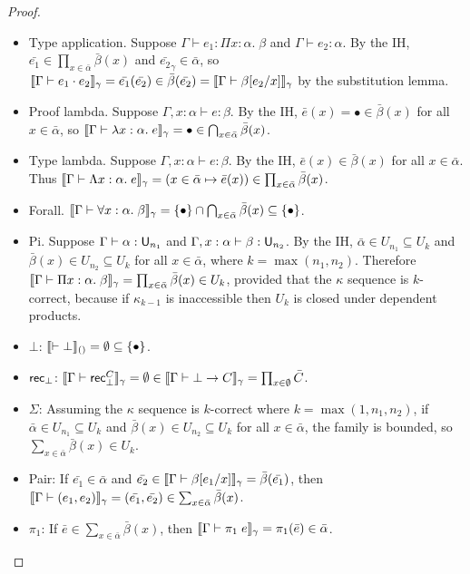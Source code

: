 \begin{proof}
\begin{itemize}
\item Type application. Suppose $\Gamma\vdash e_1:\Pi x:\alpha.\;\beta$ and $\Gamma\vdash e_2:\alpha$. By the IH, $\bar{e_1}\in\prod_{x\in \bar\alpha}\bar\beta(x)$ and $\bar{e_2}_\gamma\in\bar\alpha$, so $\scott{\Gamma\vdash e_1\cdot e_2}_\gamma=\bar{e_1}(\bar{e_2})\in\bar\beta(\bar{e_2})=\scott{\Gamma\vdash\beta[e_2/x]}_\gamma$ by the substitution lemma.
\item Proof lambda. Suppose $\Gamma,x:\alpha\vdash e:\beta$. By the IH, $\bar e(x)=\bullet\in\bar\beta(x)$ for all $x\in\bar\alpha$, so $\scott{\Gamma\vdash\lambda x:\alpha.\;e}_\gamma=\bullet\in\bigcap_{x\in \bar\alpha}\bar\beta(x)$.
\item Type lambda. Suppose $\Gamma,x:\alpha\vdash e:\beta$. By the IH, $\bar e(x)\in\bar\beta(x)$ for all $x\in\bar\alpha$. Thus $\scott{\Gamma\vdash\Lambda x:\alpha.\;e}_\gamma=(x\in\bar\alpha\mapsto\bar e(x))\in\prod_{x\in \bar\alpha}\bar\beta(x)$.
\item Forall. $\scott{\Gamma\vdash\forall x:\alpha.\;\beta}_\gamma=\{\bullet\}\cap\bigcap_{x\in \bar\alpha}\bar\beta(x)\subseteq\{\bullet\}$.
\item Pi. Suppose $\Gamma\vdash\alpha:\U_{n_1}$ and $\Gamma,x:\alpha\vdash\beta:\U_{n_2}$. By the IH, $\bar\alpha\in U_{n_1}\subseteq U_k$ and $\bar\beta(x)\in U_{n_2}\subseteq U_k$ for all $x\in\bar\alpha$, where $k=\max(n_1,n_2)$. Therefore $\scott{\Gamma\vdash\Pi x:\alpha.\;\beta}_\gamma=\prod_{x\in \bar\alpha}\bar\beta(x)\in U_k$, provided that the $\kappa$ sequence is $k$-correct, because if $\kappa_{k-1}$ is inaccessible then $U_k$ is closed under dependent products.
\item $\bot$: $\llbracket \vdash\bot\rrbracket_{()}=\emptyset\subseteq\{\bullet\}$.
\item $\mathsf{rec}_\bot$: $\scott{\Gamma\vdash\rec^C_\bot}_\gamma=\emptyset\in\scott{\Gamma\vdash\bot\to C}_\gamma=\prod_{x\in\emptyset}\bar C$.
\item $\Sigma$: Assuming the $\kappa$ sequence is $k$-correct where $k=\max(1,n_1,n_2)$, if $\bar\alpha\in U_{n_1}\subseteq U_k$ and $\bar\beta(x)\in U_{n_2}\subseteq U_k$ for all $x\in \bar\alpha$, the family is bounded, so $\sum_{x\in\bar\alpha}\bar\beta(x)\in U_k$.
\item Pair: If $\bar{e_1}\in\bar\alpha$ and $\bar{e_2}\in \scott{\Gamma\vdash\beta[e_1/x]}_\gamma=\bar\beta(\bar{e_1})$, then $\scott{\Gamma\vdash(e_1,e_2)}_\gamma=(\bar{e_1},\bar{e_2})\in \sum_{x\in\bar\alpha}\bar\beta(x)$.
\item $\pi_1$: If $\bar e\in \sum_{x\in\bar\alpha}\bar\beta(x)$, then $\scott{\Gamma\vdash\pi_1\;e}_\gamma=\pi_1(\bar e)\in\bar\alpha$.

\end{itemize}
\end{proof}
